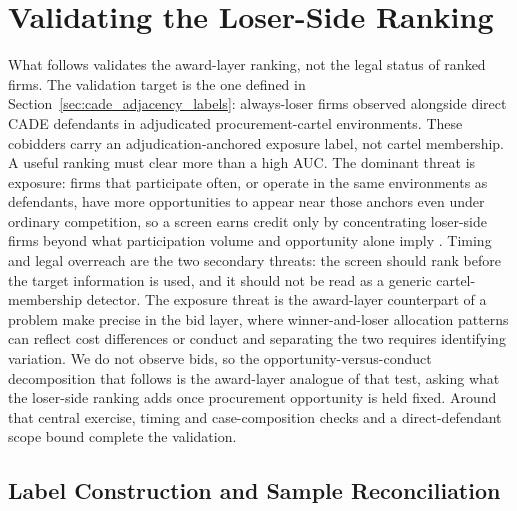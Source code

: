 \section{Validating the Loser-Side Ranking}
\label{sec:validation}

What follows validates the award-layer ranking, not the legal
status of ranked firms. The validation target is the one defined
in Section~\ref{sec:cade_adjacency_labels}: always-loser firms
observed alongside direct CADE defendants in adjudicated
procurement-cartel environments. These cobidders carry an
adjudication-anchored exposure label, not cartel membership. A
useful ranking must clear more than a high AUC. The dominant
threat is exposure: firms that participate often, or operate in the
same environments as defendants, have more opportunities to appear
near those anchors even under ordinary competition, so a screen
earns credit only by concentrating loser-side firms beyond what
participation volume and opportunity alone imply
\citep{porter1993detection,bajari2003deciding,conley2016detecting,kawai2022detecting}.
Timing and legal overreach are the two secondary threats: the
screen should rank before the target information is used, and it
should not be read as a generic cartel-membership detector. The
exposure threat is the award-layer counterpart of a problem
\citet{kawai2023bidrotation} make precise in the bid layer, where
winner-and-loser allocation patterns can reflect cost differences
or conduct and separating the two requires identifying variation.
We do not observe bids, so the opportunity-versus-conduct
decomposition that follows is the award-layer analogue of that test,
asking what the loser-side ranking adds once procurement opportunity
is held fixed. Around that central exercise, timing and
case-composition checks and a direct-defendant scope bound complete
the validation.

\subsection{Label Construction and Sample Reconciliation}
\label{sec:label_funnel}

